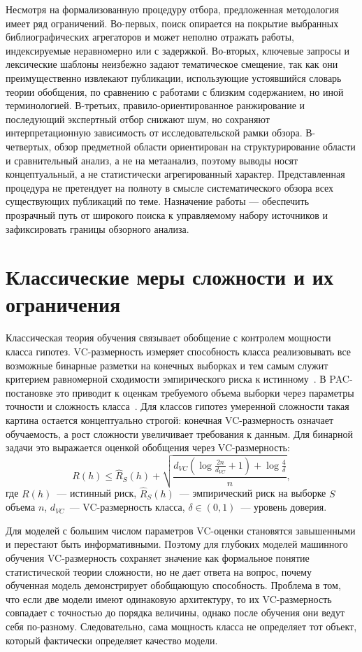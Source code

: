 \documentclass[russian]{intsys}
\begin{document}
Несмотря на формализованную процедуру отбора, предложенная методология имеет ряд ограничений.
Во-первых, поиск опирается на покрытие выбранных библиографических агрегаторов и может неполно отражать работы, индексируемые неравномерно или с задержкой.
Во-вторых, ключевые запросы и лексические шаблоны неизбежно задают тематическое смещение, так как они преимущественно извлекают публикации, использующие устоявшийся словарь теории обобщения, по сравнению с работами с близким содержанием, но иной терминологией.
В-третьих, правило-ориентированное ранжирование и последующий экспертный отбор снижают шум, но сохраняют интерпретационную зависимость от исследовательской рамки обзора.
В-четвертых, обзор предметной области ориентирован на структурирование области и сравнительный анализ, а не на метаанализ, поэтому выводы носят концептуальный, а не статистически агрегированный характер.
Представленная процедура не претендует на полноту в смысле систематического обзора всех существующих публикаций по теме.
Назначение работы --- обеспечить прозрачный путь от широкого поиска к управляемому набору источников и зафиксировать границы обзорного анализа.

\section{Классические меры сложности и их ограничения}
Классическая теория обучения связывает обобщение с контролем мощности класса гипотез.
VC-размерность измеряет способность класса реализовывать все возможные бинарные разметки на конечных выборках и тем самым служит критерием равномерной сходимости эмпирического риска к истинному~\cite{vapnik1971uniform,vapnik1998statistical}.
В PAC-постановке это приводит к оценкам требуемого объема выборки через параметры точности и сложность класса~\cite{valiant1984theory}.
Для классов гипотез умеренной сложности такая картина остается концептуально строгой: конечная VC-размерность означает обучаемость, а рост сложности увеличивает требования к данным.
Для бинарной задачи это выражается оценкой обобщения через VC-размерность:
\begin{equation}
R(h)\le \hat R_S(h)+\sqrt{\frac{d_{VC}\!\left(\log\frac{2n}{d_{VC}}+1\right)+\log\frac{4}{\delta}}{n}},
\label{eq:vc_bound}
\end{equation}
где $R(h)$~--- истинный риск, $\hat R_S(h)$~--- эмпирический риск на выборке $S$ объема $n$, $d_{VC}$~--- VC-размерность класса, $\delta\in(0,1)$~--- уровень доверия.

Для моделей с большим числом параметров VC-оценки становятся завышенными и перестают быть информативными.
Поэтому для глубоких моделей машинного обучения VC-размерность сохраняет значение как формальное понятие статистической теории сложности, но не дает ответа на вопрос, почему обученная модель демонстрирует обобщающую способность.
Проблема в том, что если две модели имеют одинаковую архитектуру, то их VC-размерность совпадает с точностью до порядка величины, однако после обучения они ведут себя по-разному.
Следовательно, сама мощность класса не определяет тот объект, который фактически определяет качество модели.
\end{document}
